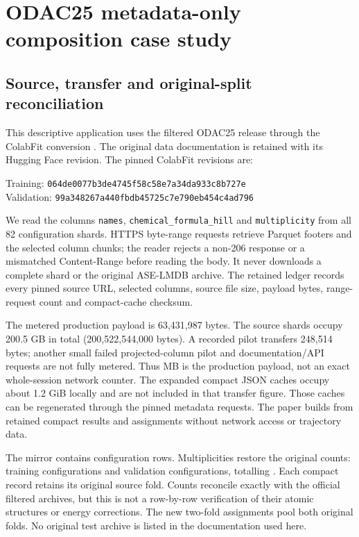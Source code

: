 \section{ODAC25 metadata-only composition case study}
\label{supp:odac25}

\subsection{Source, transfer and original-split reconciliation}

This descriptive application uses the filtered ODAC25 release
\citep{sriram2026odac25} through the ColabFit conversion
\citep{colabfit2026odac25}. The original data documentation is retained with
its Hugging Face revision. The pinned ColabFit revisions are:
\begin{flushleft}
Training: \texttt{064de0077b3de4745f58c58e7a34da933c8b727e}\\
Validation: \texttt{99a348267a440fbdb45725c7e790eb454c4ad796}
\end{flushleft}
We read the columns \texttt{names}, \texttt{chemical\_formula\_hill} and
\texttt{multiplicity} from all 82 configuration shards. HTTPS byte-range
requests retrieve Parquet footers and the selected column chunks; the reader
rejects a non-206 response or a mismatched Content-Range before reading the
body. It never downloads a complete shard or the original ASE-LMDB archive.
The retained ledger records every pinned source URL, selected columns, source
file size, payload bytes, range-request count and compact-cache checksum.

The metered production payload is 63,431,987 bytes. The source shards occupy
200.5 GB in total (200,522,544,000 bytes). A recorded pilot transfers 248,514
bytes; another small failed projected-column pilot and documentation/API
requests are not fully metered. Thus \ODACTransferMB{} MB is the production
payload, not an exact whole-session network counter. The expanded compact
JSON caches occupy about 1.2 GiB locally and are not included in that transfer
figure. Those caches can be regenerated through the pinned metadata requests.
The paper builds from retained compact results and assignments without network
access or trajectory data.

The mirror contains \ODACUniqueRows{} configuration rows. Multiplicities
restore the original counts: \ODACTrain{} training configurations and
\ODACVal{} validation configurations, totalling \ODACFrames{}. Each compact
record retains its original source fold. Counts reconcile exactly with the
official filtered archives, but this is not a row-by-row verification of their
atomic structures or energy corrections. The new two-fold assignments pool
both original folds. No original test archive is listed in the documentation
used here.

